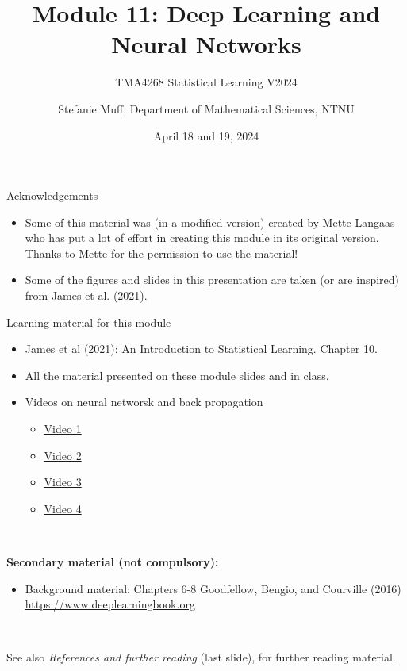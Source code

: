 \documentclass[
  10pt,
  ignorenonframetext,
]{beamer}
\title{Module 11: Deep Learning and Neural Networks}
\subtitle{TMA4268 Statistical Learning V2024}
\author{Stefanie Muff, Department of Mathematical Sciences, NTNU}
\date{April 18 and 19, 2024}
\providecommand{\tightlist}{%
  \setlength{\itemsep}{0pt}\setlength{\parskip}{0pt}}
\begin{document}
\frame{\titlepage}

\begin{frame}{Acknowledgements}
\protect\hypertarget{acknowledgements}{}
\(~\)

\begin{itemize}
\item
  Some of this material was (in a modified version) created by Mette
  Langaas who has put a lot of effort in creating this module in its
  original version. Thanks to Mette for the permission to use the
  material!
\item
  Some of the figures and slides in this presentation are taken (or are
  inspired) from James et al. (2021).
\end{itemize}
\end{frame}

\begin{frame}
\begin{block}{Learning material for this module}
\protect\hypertarget{learning-material-for-this-module}{}
\vspace{2mm}

\begin{itemize}
\item
  James et al (2021): An Introduction to Statistical Learning. Chapter
  10.
\item
  All the material presented on these module slides and in class.
\item
  Videos on neural networsk and back propagation

  \begin{itemize}
  \tightlist
  \item
    \href{https://www.youtube.com/watch?v=aircAruvnKk}{Video 1}
  \item
    \href{https://www.youtube.com/watch?v=IHZwWFHWa-w}{Video 2}
  \item
    \href{https://www.youtube.com/watch?v=Ilg3gGewQ5U}{Video 3}
  \item
    \href{https://www.youtube.com/watch?v=tIeHLnjs5U8}{Video 4}
  \end{itemize}
\end{itemize}

\(~\)

\textbf{Secondary material (not compulsory):}

\vspace{2mm}

\begin{itemize}
\tightlist
\item
  Background material: Chapters 6-8 Goodfellow, Bengio, and Courville
  (2016) \url{https://www.deeplearningbook.org}
\end{itemize}

\(~\)

See also \emph{References and further reading} (last slide), for further
reading material.
\end{block}
\end{frame}
\end{document}
